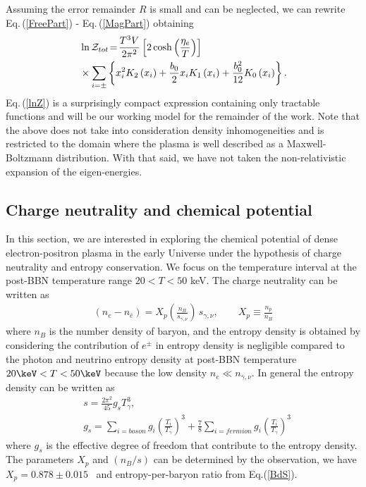 \documentclass[twocolumn,preprintnumbers,amsmath,amssymb]{revtex4-2}
\newcommand{\req}[1]{Eq.\,({\ref{#1}})}
\begin{document}
Assuming the error remainder $R$ is small and can be neglected, we can rewrite \req{FreePart} - \req{MagPart} obtaining
\begin{align}
 \label{lnZ}
&\ln\mathcal{Z}_{tot}\!=\!\frac{T^3V}{2\pi^2}\left[2\cosh\left(\frac{\eta_{e}}{T}\right)\right]\notag\\
 &\times\sum_{i=\pm}\left\{x_i^{2} K_2\left(x_i\right)+\frac{b_0}{2}x_iK_1\left(x_i\right)+\frac{b^2_0}{12}K_0\left(x_i\right)\right\}.
\end{align}
\req{lnZ} is a surprisingly compact expression containing only tractable functions and will be our working model for the remainder of the work. Note that the above does not take into consideration density inhomogeneities and is restricted to the domain where the plasma is well described as a Maxwell-Boltzmann distribution. With that said, we have not taken the non-relativistic expansion of the eigen-energies.

\subsection{Charge neutrality and chemical potential}
\noindent In this section, we are interested in exploring the chemical potential of dense electron-positron plasma in the early Universe under the hypothesis of charge neutrality and entropy conservation. We focus on the temperature interval at the post-BBN temperature range $20<T<50$ keV. The charge neutrality can be written as
\begin{align}
 \label{density_proton}
 \left(n_{e}-n_{\bar{e}}\right)= X_p\left(\frac{n_B}{s_{\gamma,\nu}}\right)\,s_{\gamma,\nu},\qquad X_p\equiv\frac{n_p}{n_B}
\end{align}
where $n_B$ is the number density of baryon, and the entropy density is obtained by considering the contribution of $e^\pm$ in entropy density is negligible compared to the photon and neutrino entropy density at post-BBN temperature $20\keV<T<50\keV$ because the low density $n_e\ll n_{\gamma,\nu}$. In general the entropy density can be written as~\cite{kolb1990early}
\begin{align}
&s=\frac{2\pi^2}{45}g_sT_\gamma^3,\\ &g_s=\sum_{i=boson}g_i\left(\frac{T_i}{T_\gamma}\right)^3+\frac{7}{8}\sum_{i=fermion}g_i\left(\frac{T_i}{T_\gamma}\right)^3
\end{align}
where $g_s$ is the effective degree of freedom that contribute to the entropy density. The parameters $X_p$ and $(n_B/s)$ can be determined by the observation, we have $X_p=0.878\pm0.015$~\cite{ParticleDataGroup:2022pth} and entropy-per-baryon ratio from Eq.(\ref{BdS}). 
\end{document}
